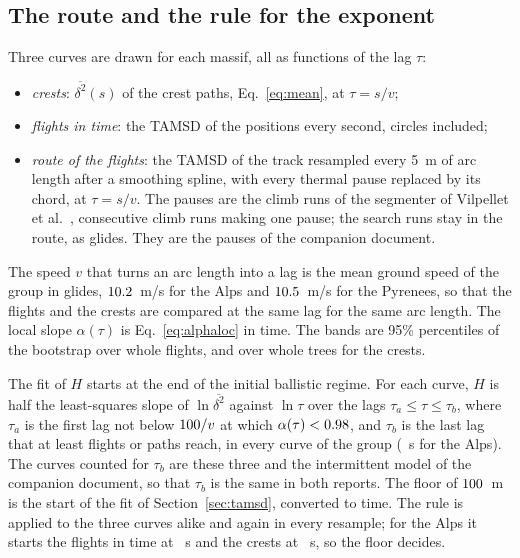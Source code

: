 \subsection{The route and the rule for the exponent}\label{sec:flcurves}

Three curves are drawn for each massif, all as functions of the lag $\tau$:
\begin{itemize}[nosep]
  \item \emph{crests}: $\overline{\delta^2}(s)$ of the crest paths, Eq.~\eqref{eq:mean}, at $\tau = s/v$;
  \item \emph{flights in time}: the TAMSD of the positions every second, circles included;
  \item \emph{route of the flights}: the TAMSD of the track resampled every 5~m of arc length after a smoothing spline, with every
        thermal pause replaced by its chord, at $\tau = s/v$. The pauses are the climb runs of the segmenter of Vilpellet et al.~\cite{vilpellet},
        consecutive climb runs making one pause; the search runs stay in the route, as glides. They are the pauses of the companion document.
\end{itemize}
The speed $v$ that turns an arc length into a lag is the mean ground speed of the group in glides, $10.2$~m/s for the Alps and
$10.5$~m/s for the Pyrenees, so that the flights and the crests are compared at the same lag for the same arc length. The local slope $\alpha(\tau)$ is
Eq.~\eqref{eq:alphaloc} in time. The bands are 95\% percentiles of the bootstrap over whole flights, and over whole trees for the crests.

The fit of $H$ starts at the end of the initial ballistic regime. For each curve, $H$ is half the least-squares slope of $\ln\overline{\delta^2}$ against $\ln\tau$ over the lags
$\tau_a \le \tau \le \tau_b$, where $\tau_a$ is the first lag not below $100/v$ at which $\alpha(\tau) < 0.98$, and $\tau_b$ is the last lag that at least
\flMinRows{} flights or paths reach, in every curve of the group (\flTauMaxAlpsPara~s for the Alps). The curves counted for $\tau_b$ are these three and the intermittent
model of the companion document, so that $\tau_b$ is the same in both reports. The floor of $100$~m is the start of the fit of Section~\ref{sec:tamsd}, converted to
time. The rule is applied to the three curves alike and again in every resample; for the Alps it starts the flights in time at \flStartDynAlpsPara~s and the crests at
\flStartGeoAlpsPara~s, so the floor decides.
